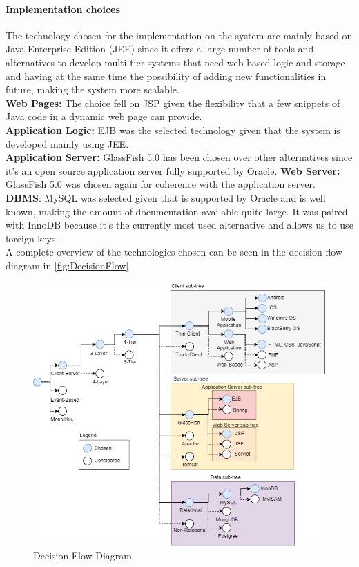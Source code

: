 \paragraph*{Implementation choices\\}
The technology chosen for the implementation on the system are mainly based on Java Enterprise Edition (JEE) since it offers a large number of tools and alternatives to develop multi-tier systems that need web based logic and storage and having at the same time the possibility of adding new functionalities in future, making the system more scalable.\\
\textbf{Web Pages:} The choice fell on JSP given the flexibility that a few snippets of Java code in a dynamic web page can provide.\\
\textbf{Application Logic:} EJB was the selected technology given that the system is developed mainly using JEE.\\
\textbf{Application Server:} GlassFish 5.0 has been chosen over other alternatives since it's an open source application server fully supported by Oracle.
\textbf{Web Server:} GlassFish 5.0 was chosen again for coherence with the application server.\\
\textbf{DBMS}: MySQL was selected given that is supported by Oracle and is well known, making the amount of documentation available quite large. It was paired with InnoDB because it's the currently most used alternative and allows us to use foreign keys.\\

A complete overview of the technologies chosen can be seen in the decision flow diagram in \autoref{fig:DecisionFlow}
\begin{figure}
\includegraphics[width = \textwidth, keepaspectratio = true]{Img/DecisionFlow}
	\caption{Decision Flow Diagram}
	\label{fig:DecisionFlow}
\end{figure}


